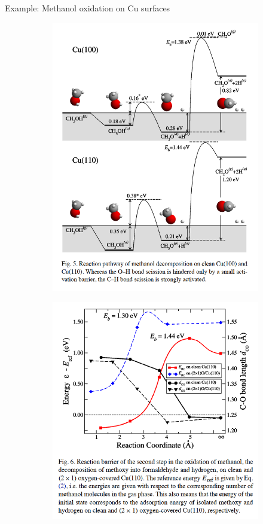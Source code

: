 \documentclass[aspectratio=169]{beamer}
\begin{document}
    \begin{frame}{Example: Methanol oxidation on Cu surfaces}
        \begin{figure}
            \centering
            \begin{subfigure}{0.45\textwidth}
                \centering
                \includegraphics[width=0.65\linewidth]{lectures/figures/12-Methanol_Cu_1.png}
            \end{subfigure}
            \begin{subfigure}{0.45\textwidth}
                \centering
                \includegraphics[width=0.8\linewidth]{lectures/figures/12-Methanol_Cu_2.png}
            \end{subfigure}
            \caption{\cite{sakongDensityFunctionalTheory2005}}
        \end{figure}
    \end{frame}
\end{document}
